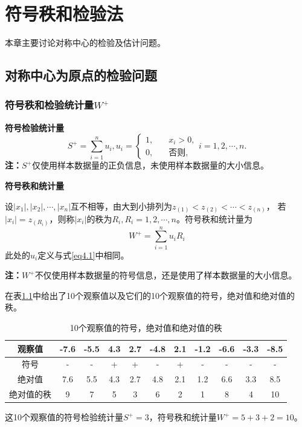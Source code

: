 \documentclass[lang=cn,10pt]{elegantbook}
\begin{document}
\chapter{符号秩和检验法}
本章主要讨论对称中心的检验及估计问题。
\section{对称中心为原点的检验问题}
\subsection{符号秩和检验统计量$W^+$}
\textbf{符号检验统计量}
\begin{equation}\label{eq4.1}
    S^+=\sum_{i=1}^nu_i,u_i=
    \begin{cases}1,\quad & x_i>0,     \\
             0,\quad & \text{否则,}
    \end{cases}i=1,2,\cdots,n.
\end{equation}
\textbf{注：}$S^+$仅使用样本数据量的正负信息，未使用样本数据量的大小信息。

\textbf{符号秩和统计量}

设$|x_1|,|x_2|,\cdots,|x_n|$互不相等，由大到小排列为$z_{(1)}<z_{(2)}<\cdots<z_{(n)}$，
若$|x_i|=z_{(R_i)}$，则称$|x_i|$的秩为$R_i,R_{i}=1,2,\cdots,n$。符号秩和统计量为
\begin{equation}
    W^+=\sum_{i=1}^nu_iR_i
\end{equation}
此处的$u_i$定义与式\ref{eq4.1}中相同。

\textbf{注：}$W^+$不仅使用样本数据量的符号信息，还是使用了样本数据量的大小信息。

在表\ref{ta4.1}中给出了10个观察值以及它们的10个观察值的符号，绝对值和绝对值的秩。
\begin{table}[htbp]
    \centering
    \caption{10个观察值的符号，绝对值和绝对值的秩}
    \label{ta4.1}
    \begin{tabular}{c|c|c|c|c|c|c|c|c|c|c}
        \hline
        观察值   & -7.6 & -5.5 & 4.3 & 2.7 & -4.8 & 2.1 & -1.2 & -6.6 & -3.3 & -8.5 \\
        \hline
        符号    & -    & -    & +   & +   & -    & +   & -    & -    & -    & -    \\
        \hline
        绝对值   & 7.6  & 5.5  & 4.3 & 2.7 & 4.8  & 2.1 & 1.2  & 6.6  & 3.3  & 8.5  \\
        \hline
        绝对值的秩 & 9    & 7    & 5   & 3   & 6    & 2   & 1    & 8    & 4    & 10   \\
        \hline
    \end{tabular}
\end{table}
这10个观察值的符号检验统计量$S^+=3$，符号秩和统计量$W^+=5+3+2=10$。
\end{document}
